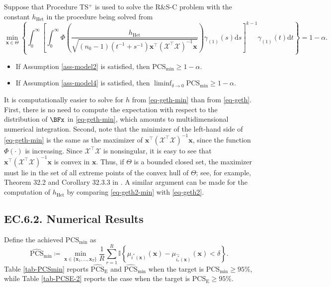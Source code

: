 \documentclass[ijoc,nonblindrev]{informs3}
\def\ud{\mathrm{d}}
\def\bx{{\bm x}}
\def\cX{{\mathcal X}}
\def\PCSE{\mathrm{PCS}_{\mathrm{E}}}
\def\APCSE{\widehat{\mathrm{PCS}}_{\mathrm{E}}}
\def\hhet{h_{\mathrm{Het}}}
\def\PCSmin{\mathrm{PCS}_{\mathrm{min}}}
\def\APCSmin{\widehat{\mathrm{PCS}}_{\mathrm{min}}}
\begin{document}
\begin{theorem}
Suppose that Procedure TS$^+$ is used to solve the R\&S-C problem with the constant $\hhet$ in the procedure being solved from
\begin{equation} \label{eq-geth2-min}
\min_{\bx\in\Theta} \left\{ \int_0^\infty \left[ \int_0^\infty \Phi \left(  \frac{\hhet}{\sqrt{ (n_0-1) (t^{-1}+s^{-1})\bx^\intercal (\cX^\intercal \cX)^{-1} \bx }} \right) \gamma_{(1)}(s) \ud s \right]^{k-1} \gamma_{(1)}(t) \ud t \right\} = 1-\alpha.
\end{equation}
\begin{itemize}
    \item If Assumption \ref{ass-model2} is satisfied, then $\PCSmin \geq 1-\alpha$.
    \item If Assumption \ref{ass-model4} is satisfied, then $\liminf_{\delta \to  0} \PCSmin \geq 1-\alpha$.
\end{itemize}
\end{theorem}



\begin{remark}
It is computationally easier to solve for $h$  from \eqref{eq-geth-min}  than from \eqref{eq-geth}.
First, there is no need to compute the expectation with respect to the distribution of $\BFx$  in \eqref{eq-geth-min}, which amounts to
multidimensional numerical integration.
Second, note that the minimizer of the left-hand side of \eqref{eq-geth-min} is the same as the maximizer of $\bx^\intercal (\cX^\intercal \cX)^{-1} \bx$, since the function $\Phi(\cdot)$ is increasing.
Since $\cX^\intercal \cX$ is nonsingular, it is easy to see that $\bx^\intercal (\cX^\intercal \cX)^{-1} \bx$ is convex in $\bx$.
Thus, if $\Theta$ is a bounded closed set, the maximizer must lie in the set of all extreme points of the convex hull of $\Theta$; see, for example, Theorem 32.2 and Corollary 32.3.3 in \cite{rockafellar1970_ec}.
A similar argument can be made for the computation of $\hhet$ by comparing \eqref{eq-geth2-min} with \eqref{eq-geth2}.
\end{remark}


\vspace{5pt}
\subsection*{EC.6.2. \hspace{5pt} Numerical Results}


Define the achieved $\PCSmin$ as
\[\APCSmin \coloneqq  \min_{\bx\in\{\bx_1,\ldots,\bx_T\}} \frac{1}{R} \sum_{r=1}^R \mathbb{I} \left\{ \mu_{i^*(\bx)}(\bx) - \mu_{\widehat{i^*_r}(\bx)}(\bx)  < \delta \right\}.\]
Table \ref{tab-PCSmin} reports $\APCSE$ and $\APCSmin$ when the target is $\PCSmin \geq 95\%$, while Table \ref{tab-PCSE-2} reports the case when the target is $\PCSE \geq 95\%$.
\end{document}
